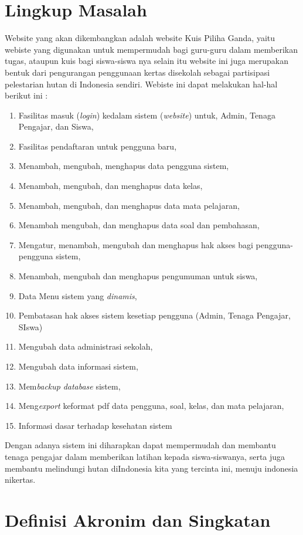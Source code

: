 \documentclass{scrreprt}
\begin{document}
\section{Lingkup Masalah}
Website yang akan dikembangkan adalah website Kuis Piliha Ganda, yaitu webiste yang digunakan untuk mempermudah bagi guru-guru dalam memberikan tugas, ataupun kuis bagi siswa-siswa nya selain itu website ini juga merupakan bentuk dari pengurangan penggunaan kertas disekolah sebagai partisipasi pelestarian hutan di Indonesia sendiri. Webiste ini dapat melakukan hal-hal berikut ini :
	\begin{enumerate}
		\item Fasilitas masuk (\emph{login}) kedalam sistem (\emph{website}) untuk, Admin, Tenaga Pengajar, dan Siswa,
		\item Fasilitas pendaftaran untuk pengguna baru,
		\item Menambah, mengubah, menghapus data pengguna sistem,
		\item Menambah, mengubah, dan menghapus data kelas,
		\item Menambah, mengubah, dan menghapus data mata pelajaran,
		\item Menambah mengubah, dan menghapus data soal dan pembahasan,
		\item Mengatur, menambah, mengubah dan menghapus hak akses bagi pengguna-pengguna sistem,
		\item Menambah, mengubah dan menghapus pengumuman untuk siswa,
		\item Data Menu sistem yang \emph{dinamis},
		\item Pembatasan hak akses sistem kesetiap pengguna (Admin, Tenaga Pengajar, SIswa)
		\item Mengubah data administrasi sekolah,
		\item Mengubah data informasi sistem,
		\item Mem\emph{backup} \emph{database} sistem,
		\item Meng\emph{export} keformat pdf data pengguna, soal, kelas, dan mata pelajaran,
		\item Informasi dasar terhadap kesehatan sistem
	\end{enumerate}

Dengan adanya sistem ini diharapkan dapat mempermudah dan membantu tenaga pengajar dalam memberikan latihan kepada siswa-siswanya, serta juga membantu melindungi hutan diIndonesia kita yang tercinta ini, menuju indonesia nikertas.

\section{Definisi Akronim dan Singkatan}
\end{document}
